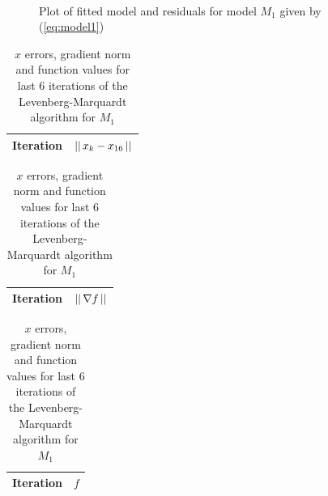 \begin{figure}
    \centering
    \mbox{ \quad {}}
    \caption{Plot of fitted model and residuals for model $M_1$ given by (\ref{eq:model1})}
    \label{fig:model1-plots}
\end{figure}

\begin{table}
    \centering
    \begin{tabular}{c c}
        Iteration & $||\,x_k - x_{16}\,||$ \\\hline
        
    \end{tabular}
    \hspace{5mm}
    \begin{tabular}{c c}
        Iteration & $||\,\nabla f\,||$ \\\hline
        
    \end{tabular}
    \hspace{5mm}
    \begin{tabular}{c c}
        Iteration & $f$ \\\hline
        
    \end{tabular}
    \caption{$x$ errors, gradient norm and function values for last 6 iterations of the Levenberg-Marquardt algorithm for $M_1$}
    \label{tbl:marquardt-performance}
\end{table}


